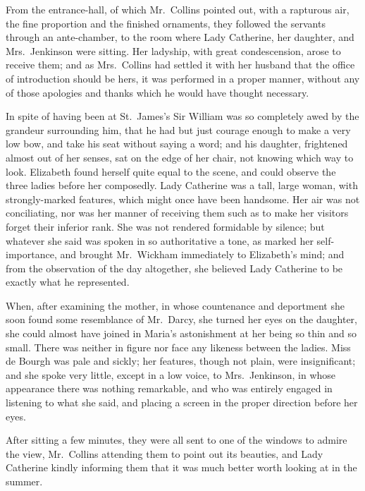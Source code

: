 \documentclass[12pt,english]{book}
\begin{document}
From the entrance-hall, of which Mr.\ Collins pointed out, with a
rapturous air, the fine proportion and the finished ornaments, they
followed the servants through an ante-chamber, to the room where Lady
Catherine, her daughter, and Mrs.\ Jenkinson were sitting. Her ladyship,
with great condescension, arose to receive them; and as Mrs.\ Collins
had settled it with her husband that the office of introduction should
be hers, it was performed in a proper manner, without any of those
apologies and thanks which he would have thought necessary.

In spite of having been at St.\ James's Sir William was so completely
awed by the grandeur surrounding him, that he had but just courage
enough to make a very low bow, and take his seat without saying a
word; and his daughter, frightened almost out of her senses, sat on
the edge of her chair, not knowing which way to look. Elizabeth found
herself quite equal to the scene, and could observe the three ladies
before her composedly. Lady Catherine was a tall, large woman, with
strongly-marked features, which might once have been handsome. Her
air was not conciliating, nor was her manner of receiving them such
as to make her visitors forget their inferior rank. She was not rendered
formidable by silence; but whatever she said was spoken in so authoritative
a tone, as marked her self-importance, and brought Mr.\ Wickham immediately
to Elizabeth's mind; and from the observation of the day altogether,
she believed Lady Catherine to be exactly what he represented.

When, after examining the mother, in whose countenance and deportment
she soon found some resemblance of Mr.\ Darcy, she turned her eyes
on the daughter, she could almost have joined in Maria's astonishment
at her being so thin and so small. There was neither in figure nor
face any likeness between the ladies. Miss de Bourgh was pale and
sickly; her features, though not plain, were insignificant; and she
spoke very little, except in a low voice, to Mrs.\ Jenkinson, in
whose appearance there was nothing remarkable, and who was entirely
engaged in listening to what she said, and placing a screen in the
proper direction before her eyes.

After sitting a few minutes, they were all sent to one of the windows
to admire the view, Mr.\ Collins attending them to point out its
beauties, and Lady Catherine kindly informing them that it was much
better worth looking at in the summer.
\end{document}
